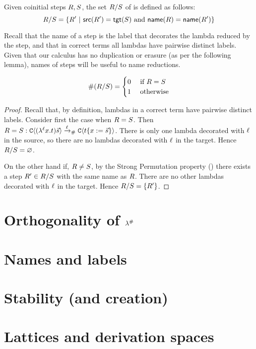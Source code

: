 \begin{definition}
Given coinitial steps $R, S$,
the set $R/S$ of  is defined as follows:
\[
  R/S = \{R' \ |\  \mathsf{src}(R') = \mathsf{tgt}(S) \text{ and } \mathsf{name}(R) = \mathsf{name}(R')\}
\]
\end{definition}

\begin{remark}
Recall that the name of a step is the label that decorates the lambda reduced by the step,
and that in correct terms all lambdas have pairwise distinct labels.
Given that our calculus has no duplication or erasure (as per the following lemma),
names of steps will be useful to name reductions.
\end{remark}


\begin{lemma}
\[
  \#(R/S) = \begin{cases}
                         0 & \text{ if $R = S$} \\
                         1 & \text{ otherwise}
                         \end{cases}
\]
\end{lemma}
\begin{proof}
Recall that, by definition, lambdas in a correct term have pairwise distinct labels.
Consider first the case when $R = S$.
Then
$
  R = S : \mathtt{C}\langle(\lambda^{\ell} x. t)\vec{s}\rangle \mathrel{\xrightarrow{\ell}_{\mathtt{\#}}} \mathtt{C}\langle t\{x := \vec{s}\}\rangle
$.
There is only one lambda decorated with $\ell$ in the source,
so there are no lambdas decorated with $\ell$ in the target.
Hence $R/S = \varnothing$.

On the other hand if, $R \neq S$,
by the Strong Permutation property ()
there exists a step $R' \in R/S$
with the same name as $R$.
There are no other lambdas decorated with $\ell$ in the target.
Hence $R/S = \{R'\}$.
\end{proof}


\section{Orthogonality of $\lambda^{\mathtt{\#}}$}


\section{Names and labels}


\section{Stability (and creation)}


\section{Lattices and derivation spaces}





